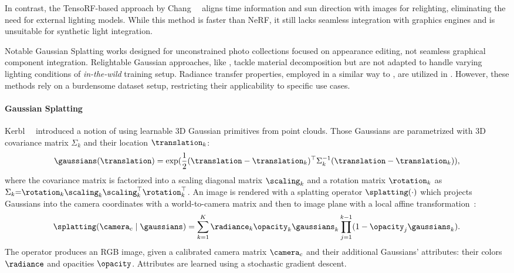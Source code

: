     In contrast, the TensoRF-based approach by
    Chang~\etal~\cite{chang2024srtensorf} aligns time information and sun
    direction with images for relighting, eliminating the need for external
    lighting models.
    While this method is faster than NeRF, it still lacks seamless integration
    with graphics engines and is unsuitable for synthetic light integration.

    Notable Gaussian Splatting works designed for unconstrained photo
    collections \cite{kerbl20233d, dahmani2024swagsplattingwildimages,
    zhang2024gaussian, xu2024wildgs, wang2024wegs} focused on appearance
    editing, not seamless graphical component integration.
    Relightable Gaussian approaches, like \cite{gao2023relightable,
    liang2024gs, shi2023gir}, tackle material decomposition but are not
    adapted to handle varying lighting conditions of \textit{in-the-wild}
    training setup.
    Radiance transfer properties, employed in a similar way to \lumigauss, are
    utilized in \cite{zhang2024prtgaussianefficientrelightingusing,
    saito2024relightablecodecavatar}.
    However, these methods rely on a burdensome dataset setup, restricting
    their applicability to specific use cases.

  \paragraph{Gaussian Splatting}
    Kerbl~\etal~\cite{kerbl20233d} introduced a notion of using learnable 3D
    Gaussian primitives from point clouds.
    Those Gaussians are parametrized with 3D covariance matrix $\Sigma_k$ and their location $\translation_k$:
    \begin{equation}
      \gaussians(\translation) = \exp(\frac{1}{2}(\translation - \translation_k)^\top\Sigma_k^{-1}(\translation - \translation_k)),
    \end{equation}
    where the covariance matrix is factorized into a scaling diagonal matrix $\scaling_k$ and a rotation matrix $\rotation_k$ as $\Sigma_k{=}\rotation_k\scaling_k\scaling_k^\top\rotation_k^\top$. An image is rendered with a splatting operator $\splatting(\cdot)$ which projects Gaussians into the camera coordinates with a world-to-camera matrix and then to image plane with a local affine transformation~\cite{zwicker2001ewa}:
    \begin{equation}
      \label{eq:lumigauss-splatting-op}
      \splatting(\camera_c\;|\;\gaussians) = \sum_{k=1}^K\radiance_k\opacity_k\gaussians_k\prod^{k-1}_{j=1}(1 - \opacity_j \gaussians_k).
    \end{equation}
    The operator produces an RGB image, given a calibrated camera matrix
    $\camera_c$ and their additional Gaussians' attributes: their colors
    $\radiance$ and opacities $\opacity$.
    Attributes are learned using a stochastic gradient descent.

